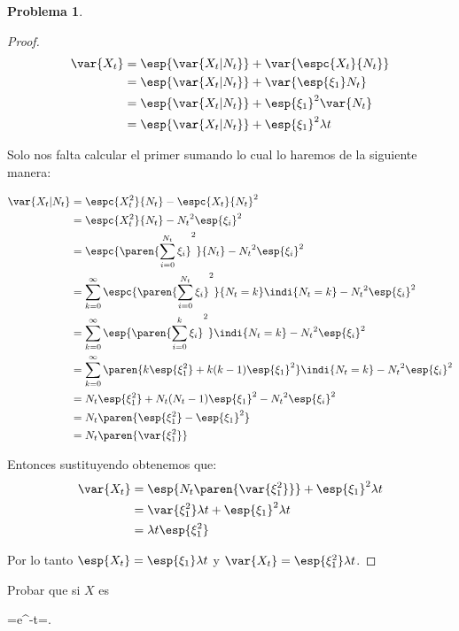 \documentclass[a5paper,oneside]{amsart}
\theoremstyle{plain}
\theoremstyle{definition}
\newtheorem{problema}{Problema}
\begin{document}
\begin{problema}
\begin{proof}
\begin{align}
\var{X_t}&=\esp{\var{X_t|N_t}}+\var{\espc{X_t}{N_t}} \notag \\
&=\esp{\var{X_t|N_t}}+\var{\esp{\xi_1}N_t}\notag \\
&=\esp{\var{X_t|N_t}}+\esp{\xi_1}^2\var{N_t}\notag \\
&=\esp{\var{X_t|N_t}}+\esp{\xi_1}^2\lambda t \notag
\end{align}

Solo nos falta calcular el primer sumando lo cual lo haremos de la siguiente manera:

\begin{align}
\var{X_t|N_t}&=\espc{X_t^2}{N_t}-\espc{X_t}{N_t}^2\notag \\
&=\espc{X_t^2}{N_t}-{N_t}^2\esp{\xi_i}^2\notag \\
&=\espc{\paren{\sum_{i=0}^{N_t}\xi_i}^2}{N_t}-{N_t}^2\esp{\xi_i}^2\notag \\
&=\sum_{k=0}^{\infty}\espc{\paren{\sum_{i=0}^{N_t}\xi_i}^2}{N_t=k}\indi{N_t=k}-{N_t}^2\esp{\xi_i}^2\notag \\
&=\sum_{k=0}^{\infty}\esp{\paren{\sum_{i=0}^{k}\xi_i}^2}\indi{N_t=k}-{N_t}^2\esp{\xi_i}^2\notag \\
&=\sum_{k=0}^{\infty}\paren{k\esp{\xi_1^2}+k(k-1)\esp{\xi_1}^2}\indi{N_t=k}-{N_t}^2\esp{\xi_i}^2\notag \\
&=N_t\esp{\xi_1^2}+N_t(N_t-1)\esp{\xi_1}^2-{N_t}^2\esp{\xi_i}^2\notag \\
&=N_t\paren{\esp{\xi_1^2}-\esp{\xi_1}^2}\notag \\
&=N_t\paren{\var{\xi_1^2}} \notag
\end{align}

Entonces sustituyendo obtenemos que:
\begin{align}
\var{X_t}&=\esp{N_t\paren{\var{\xi_1^2}}}+\esp{\xi_1}^2\lambda t \notag \\
&=\var{\xi_1^2}\lambda t+\esp{\xi_1}^2\lambda t \notag \\
&=\lambda t \esp{\xi_1^2}\notag
\end{align}

Por lo tanto $\esp{X_t}=\esp{\xi_1}\lambda t$ y $\var{X_t}=\esp{\xi_1^2}\lambda t$.

\end{proof}

Probar que si $X$ es\begin{esn}
=e^{-\lambda t}\quad{}\quad {}=.\end{esn}


\end{problema}
\end{document}
